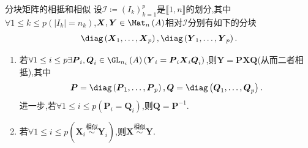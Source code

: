 \begin{remark}{分块矩阵的相抵和相似}{}
	设$\mathcal{I}\coloneq\left(I_{k}\right)_{k=1}^{p}$是$\llbracket 1,n\rrbracket$的划分,其中$\forall 1\leq k\leq p\left(\left|I_{k}\right|=n_{k}\right)$,$\boldsymbol{X},\boldsymbol{Y}\in\Mat_{n}\left(A\right)$相对$\mathcal{I}$分别有如下的分块
	\begin{align*}
		\diag\left(\boldsymbol{X}_{1},\ldots,\boldsymbol{X}_{p}\right),\diag\left(\boldsymbol{Y}_{1},\ldots,\boldsymbol{Y}_{p}\right).
	\end{align*}
	\begin{enumerate}
		\item 若$\forall 1\leq i\leq p\exists\boldsymbol{P}_{i},\boldsymbol{Q}_{i}\in\GL_{n_{i}}\left(A\right)\left(\boldsymbol{Y}_{i}=\boldsymbol{P}_{i}\boldsymbol{X}_{i}\boldsymbol{Q}_{i}\right)$,则$\boldsymbol{Y}=\boldsymbol{P}\boldsymbol{X}\boldsymbol{Q}$(从而二者相抵),其中
		\begin{align*}
			\boldsymbol{P}=\diag\left(\boldsymbol{P}_{1},\ldots,\boldsymbol{P}_{p}\right),\boldsymbol{Q}=\diag\left(\boldsymbol{Q}_{1},\ldots,\boldsymbol{Q}_{p}\right).
		\end{align*}
		进一步,若$\forall 1\leq i\leq p\left(\boldsymbol{P}_{i}=\boldsymbol{Q}_{i}\right)$,则$\boldsymbol{Q}=\boldsymbol{P}^{-1}$.
		\item 若$\forall 1\leq i\leq p\left(\boldsymbol{X}_{i}\overset{\text{相似}}{\sim}\boldsymbol{Y}_{i}\right)$,则$\boldsymbol{X}\overset{\text{相似}}{\sim}\boldsymbol{Y}$.
	\end{enumerate}
\end{remark}




